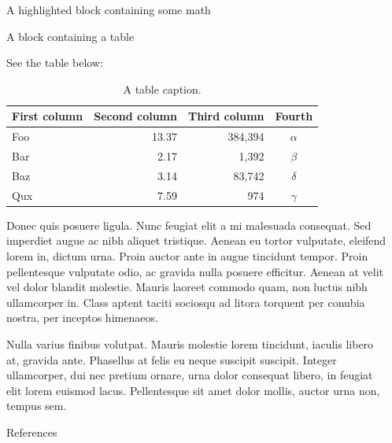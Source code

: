 \documentclass[final]{beamer}
\newlength{\sepwidth}
\newlength{\colwidth}
\newcommand{\separatorcolumn}{\begin{column}{\sepwidth}\end{column}}
\begin{document}
\begin{frame}[t]
\begin{columns}[t]
\begin{column}{\colwidth}
\begin{exampleblock}{A highlighted block containing some math}
  \end{exampleblock}

  \begin{block}{A block containing a table}

    See the table below:

    \begin{table}
      \centering
      \begin{tabular}{l r r c}
        \toprule
        \textbf{First column} & \textbf{Second column} & \textbf{Third column} & \textbf{Fourth} \\
        \midrule
        Foo & 13.37 & 384,394 & $\alpha$ \\
        Bar & 2.17 & 1,392 & $\beta$ \\
        Baz & 3.14 & 83,742 & $\delta$ \\
        Qux & 7.59 & 974 & $\gamma$ \\
        \bottomrule
      \end{tabular}
      \caption{A table caption.}
    \end{table}

    Donec quis posuere ligula. Nunc feugiat elit a mi malesuada consequat. Sed
    imperdiet augue ac nibh aliquet tristique. Aenean eu tortor vulputate,
    eleifend lorem in, dictum urna. Proin auctor ante in augue tincidunt
    tempor. Proin pellentesque vulputate odio, ac gravida nulla posuere
    efficitur. Aenean at velit vel dolor blandit molestie. Mauris laoreet
    commodo quam, non luctus nibh ullamcorper in. Class aptent taciti sociosqu
    ad litora torquent per conubia nostra, per inceptos himenaeos.

    Nulla varius finibus volutpat. Mauris molestie lorem tincidunt, iaculis
    libero at, gravida ante. Phasellus at felis eu neque suscipit suscipit.
    Integer ullamcorper, dui nec pretium ornare, urna dolor consequat libero,
    in feugiat elit lorem euismod lacus. Pellentesque sit amet dolor mollis,
    auctor urna non, tempus sem.

  \end{block}

  \begin{block}{References}

    \nocite{*}   %
    \footnotesize{}

  \end{block}

\end{column}

\separatorcolumn
\end{columns}
\end{frame}
\end{document}
